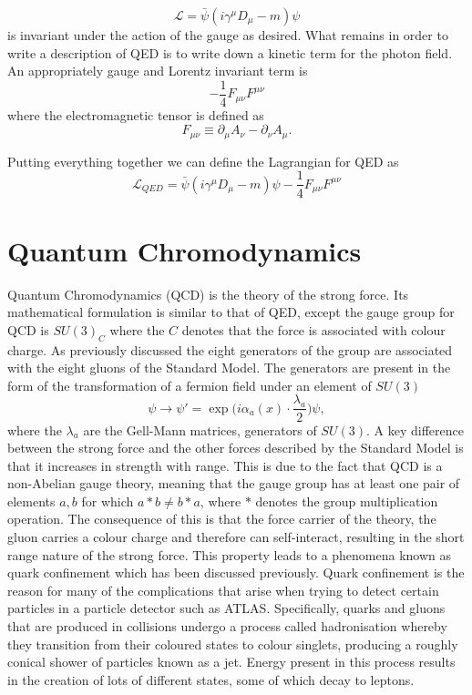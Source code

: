 \begin{equation}
  \label{eq:dirac-cov} \mathcal{L} = \bar{\psi}(i\gamma^{\mu}D_{\mu} - m)\psi
\end{equation} is invariant under the action of the gauge as desired. What
remains in order to write a description of QED is to write down a kinetic term
for the photon field. An appropriately gauge and Lorentz invariant term is
\begin{equation}
  \label{eq:em-kinetic} -\frac{1}{4}F_{\mu\nu}F^{\mu\nu}
\end{equation} where the electromagnetic tensor is defined as
\begin{equation}
  \label{eq:em-tensor} F_{\mu\nu} \equiv \partial_{\mu}A_{\nu} -
\partial_{\nu}A_{\mu}.
\end{equation}

Putting everything together we can define the Lagrangian for QED as
\begin{equation}
  \label{eq:qed} \mathcal{L}_{QED} = \bar{\psi}(i\gamma^{\mu}D_{\mu} - m)\psi
-\frac{1}{4}F_{\mu\nu}F^{\mu\nu}
\end{equation}

\section{Quantum Chromodynamics}

Quantum Chromodynamics (QCD) is the theory of the strong force. Its
mathematical formulation is similar to that of QED, except the gauge group for
QCD is $SU(3)_C$ where the $C$ denotes that the force is associated with colour
charge. As previously discussed the eight generators of the group are associated
with the eight gluons of the Standard Model. The generators are present in the
form of the transformation of a fermion field under an element of $SU(3)$
\begin{equation}
  \label{eq:su3-trans} \psi \rightarrow \psi' =
\exp\Big({i\alpha_{a}(x)\cdot\frac{\lambda_{a}}{2}}\Big)\psi,
\end{equation} where the $\lambda_a$ are the Gell-Mann matrices, generators of
$SU(3)$. A key difference between the strong force and the other forces
described by the Standard Model is that it increases in strength with range.
This is due to the fact that QCD is a non-Abelian gauge theory, meaning that the
gauge group has at least one pair of elements $a, b$ for which $a * b \neq b *
a$, where $*$ denotes the group multiplication operation. The consequence of
this is that the force carrier of the theory, the gluon carries a colour charge
and therefore can self-interact, resulting in the short range nature of the
strong force. This property leads to a phenomena known as quark confinement
which has been discussed previously. Quark confinement is the reason for many of
the complications that arise when trying to detect certain particles in a
particle detector such as ATLAS. Specifically, quarks and gluons that are
produced in collisions undergo a process called hadronisation whereby they
transition from their coloured states to colour singlets, producing a roughly
conical shower of particles known as a jet. Energy present in this process
results in the creation of lots of different states, some of which decay to
leptons.

